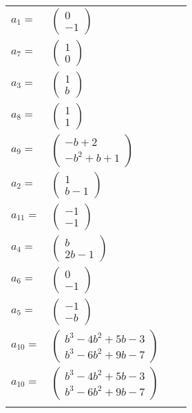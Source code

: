 \documentclass[1p]{elsarticle_modified}
\theoremstyle{definition}
\begin{document}
\begin{tabular}{m{7pt} m{180pt} m{7pt} m{180pt} }
\flushright $a_{1}=$&$\begin{pmatrix}0\\-1\end{pmatrix}$ \\
\flushright $a_{7}=$&$\begin{pmatrix}1\\0\end{pmatrix}$ \\
\flushright $a_{3}=$&$\begin{pmatrix}1\\b\end{pmatrix}$ \\
\flushright $a_{8}=$&$\begin{pmatrix}1\\1\end{pmatrix}$ \\
\flushright $a_{9}=$&$\begin{pmatrix}- b+2\\- b^2+b+1\end{pmatrix}$ \\
\flushright $a_{2}=$&$\begin{pmatrix}1\\b-1\end{pmatrix}$ \\
\flushright $a_{11}=$&$\begin{pmatrix}-1\\-1\end{pmatrix}$ \\
\flushright $a_{4}=$&$\begin{pmatrix}b\\2 b-1\end{pmatrix}$ \\
\flushright $a_{6}=$&$\begin{pmatrix}0\\-1\end{pmatrix}$ \\
\flushright $a_{5}=$&$\begin{pmatrix}-1\\- b\end{pmatrix}$ \\
\flushright $a_{10}=$&$\begin{pmatrix}b^3-4 b^2+5 b-3\\b^3-6 b^2+9 b-7\end{pmatrix}$\\ \flushright $a_{10}=$&$\begin{pmatrix}b^3-4 b^2+5 b-3\\b^3-6 b^2+9 b-7\end{pmatrix}$\\&\end{tabular}
\end{document}
